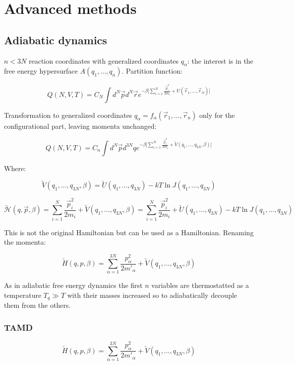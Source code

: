 \graphicspath{{chapters/20/images}}
\chapter{Advanced methods}

\section{Adiabatic dynamics}
$n<3N$ reaction coordinates with generalized coordinates $q_\alpha$: the interest is in the free energy hypersurface $A(q_1, \dots, q_n)$.
Partition function:

$$Q(N, V, T) = C_N\int d^N\vec{p}d^N\vec{r}e^{-\beta\biggl[\sum\limits_{i=1}^N\frac{\vec{p}_i^2}{2m_i}+U(\vec{r}_1, \dots, \vec{r}_N)\biggr]}$$

Transformation to generalized coordinates $q_\alpha = f_\alpha(\vec{r}_1, \dots, \vec{r}_n)$ only for the configurational part, leaving momenta unchanged:

$$Q(N, V, T) = C_n\int d^N\vec{p}d^{3N}qe^{-\beta\biggl[\sum\limits_{i=1}^N\frac{\vec{p}_i^2}{2m_i} + \tilde{V}(q_1, \dots, q_{3N}, \beta)\biggr]}$$

Where:

$$\tilde{V}(q_1, \dots, q_{3N}, \beta) = \tilde{U}(q_1, \dots, q_{3N}) - kT\ln J(q_1, \dots, q_{3N})$$

$$\tilde{\mathcal{H}}(q, \vec{p}, \beta) = \sum\limits_{i=1}^N\frac{\vec{p}_i^2}{2m_i}+\tilde{V}(q_1, \dots, q_{3N}, \beta) = \sum\limits_{i=1}^N\frac{\vec{p}_i^2}{2m_i}+\tilde{U}(q_1, \dots, q_{3N})-kT\ln J(q_1, \dots, q_{3N})$$

This is not the original Hamiltonian but can be used as a Hamiltonian.
Renaming the momenta:

$$\tilde{H}(q, p, \beta) = \sum\limits_{\alpha=1}^{3N}\frac{p_\alpha^2}{2m'_\alpha}+ \tilde{V}(q_1, \dots, q_{3N}, \beta)$$

As in adiabatic free energy dynamics the first $n$ variables are thermostatted as a temperature $T_q\gg T$ with their masses increased so to adiabatically decouple them from the others.

	\subsection{TAMD}

	$$\tilde{H}(q, p, \beta) = \sum\limits_{\alpha=1}^{3N}\frac{p_\alpha^2}{2m'_\alpha} + \tilde{V}(q_1, \dots, q_{3N}, \beta)$$

